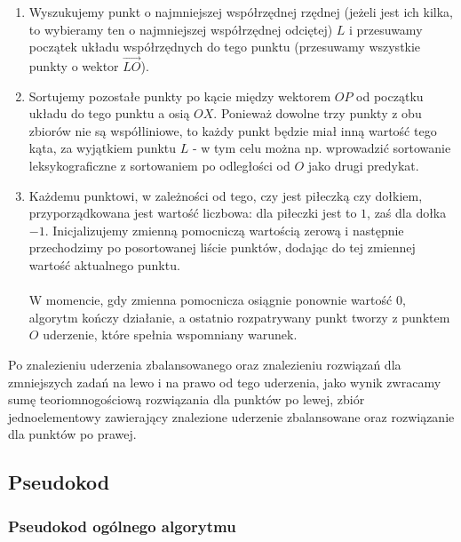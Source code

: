 \documentclass[10pt,a4paper]{article}
\begin{document}
	\begin{enumerate}
		\item Wyszukujemy punkt o najmniejszej współrzędnej rzędnej (jeżeli jest ich kilka, to wybieramy ten o najmniejszej współrzędnej odciętej) $L$ i przesuwamy początek układu współrzędnych do tego punktu (przesuwamy wszystkie punkty o wektor $\overrightarrow{LO}$).
		\item Sortujemy pozostałe punkty po kącie między wektorem $OP$ od początku układu do tego punktu a osią $OX$. Ponieważ dowolne trzy punkty z obu zbiorów nie są współliniowe, to każdy punkt będzie miał inną wartość tego kąta, za wyjątkiem punktu $L$ - w tym celu można np. wprowadzić sortowanie leksykograficzne z sortowaniem po odległości od $O$ jako drugi predykat.
		\item Każdemu punktowi, w zależności od tego, czy jest piłeczką czy dołkiem, przyporządkowana jest wartość liczbowa: dla piłeczki jest to $1$, zaś dla dołka $-1$. Inicjalizujemy zmienną pomocniczą wartością zerową i następnie przechodzimy po posortowanej liście punktów, dodając do tej zmiennej wartość aktualnego punktu.\\~\\
		W momencie, gdy zmienna pomocnicza osiągnie ponownie wartość $0$, algorytm kończy działanie, a ostatnio rozpatrywany punkt tworzy z punktem $O$ uderzenie, które spełnia wspomniany warunek.
	\end{enumerate}

	Po znalezieniu uderzenia zbalansowanego oraz znalezieniu rozwiązań dla zmniejszych zadań na lewo i na prawo od tego uderzenia, jako wynik zwracamy sumę teoriomnogościową rozwiązania dla punktów po lewej, zbiór jednoelementowy zawierający znalezione uderzenie zbalansowane oraz rozwiązanie dla punktów po prawej.
	
	\subsection{Pseudokod}

	\subsubsection{Pseudokod ogólnego algorytmu}
\end{document}
